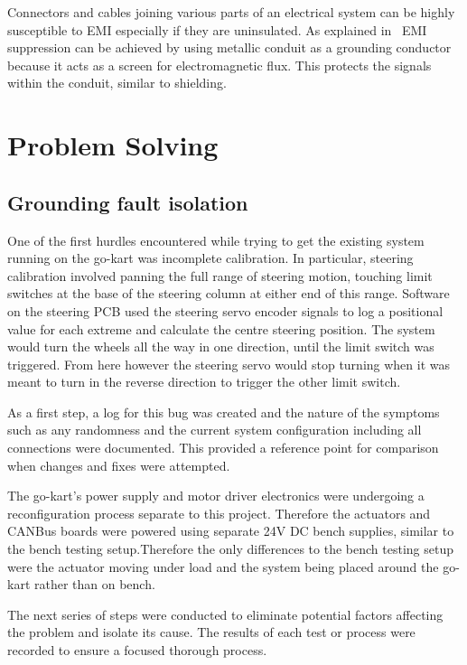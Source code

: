 \documentclass{ENZCon}
\begin{document}
Connectors and cables joining various parts of an electrical system can be highly susceptible to EMI especially if they are uninsulated. As explained in~\cite{grounding_practical} EMI suppression can be achieved by using metallic conduit as a grounding conductor because it acts as a screen for electromagnetic flux. This protects the signals within the conduit, similar to shielding. 

\section{Problem Solving}

\subsection{Grounding fault isolation}

One of the first hurdles encountered while trying to get the existing system running on the go-kart was incomplete calibration. In particular, steering calibration involved panning the full range of steering motion, touching limit switches at the base of the steering column at either end of this range. Software on the steering PCB used the steering servo encoder signals to log a positional value for each extreme and calculate the centre steering position. The system would turn the wheels all the way in one direction, until the limit switch was triggered. From here however the steering servo would stop turning when it was meant to turn in the reverse direction to trigger the other limit switch. 

As a first step, a log for this bug was created and the nature of the symptoms such as any randomness and the current system configuration including all connections were documented. This provided a reference point for comparison when changes and fixes were attempted.

The go-kart's power supply and motor driver electronics were undergoing a reconfiguration process separate to this project. Therefore the actuators and CANBus boards were powered using separate 24V DC bench supplies, similar to the bench testing setup.Therefore the only differences to the bench testing setup were the actuator moving under load and the system being placed around the go-kart rather than on bench. 

The next series of steps were conducted to eliminate potential factors affecting the problem and isolate its cause. The results of each test or process were recorded to ensure a focused thorough process. 
\end{document}
